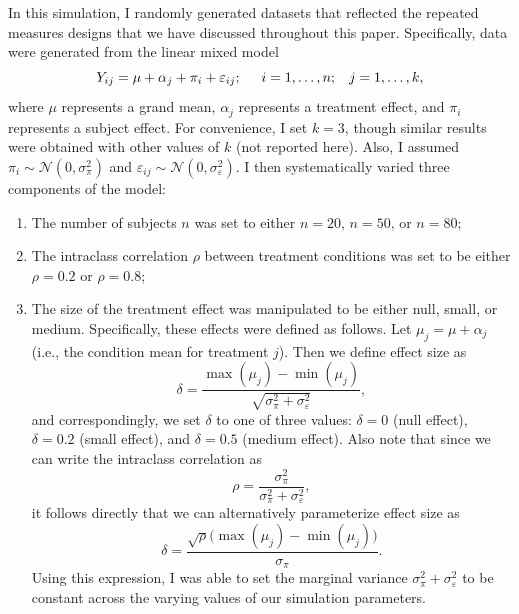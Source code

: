 \documentclass[12pt,twoside,a4paper]{article}
\begin{document}
In this simulation, I randomly generated datasets that reflected the repeated measures designs that we have discussed throughout this paper. Specifically, data were generated from the linear mixed model%
\[
  Y_{ij} = \mu + \alpha_j + \pi_i + \varepsilon_{ij};\hspace{5mm}i=1,\dots,n;\hspace{3mm}j=1,\dots,k,
\]%
where $\mu$ represents a grand mean, $\alpha_j$ represents a treatment effect, and $\pi_i$ represents a subject effect. For convenience, I set $k=3$, though similar results were obtained with other values of $k$ (not reported here). Also, I assumed $\pi_i\sim \mathcal{N}(0,\sigma_{\pi}^2)$ and $\varepsilon_{ij}\sim \mathcal{N}(0,\sigma_{\varepsilon}^2)$. I then systematically varied three components of the model:

\begin{enumerate}
\item The number of subjects $n$ was set to either $n=20$, $n=50$, or $n=80$;
\item The intraclass correlation $\rho$ between treatment conditions was set to be either $\rho=0.2$ or $\rho=0.8$; 
\item The size of the treatment effect was manipulated to be either null, small, or medium. Specifically, these effects were defined as follows. Let $\mu_j = \mu+\alpha_j$ (i.e., the condition mean for treatment $j$). Then we define effect size as%
\[
  \delta = \frac{\max(\mu_j)-\min(\mu_j)}{\sqrt{\sigma_{\pi}^2 + \sigma_{\varepsilon}^2}},
\]%
and correspondingly, we set $\delta$ to one of three values: $\delta=0$ (null effect), $\delta=0.2$ (small effect), and $\delta=0.5$ (medium effect). Also note that since we can write the intraclass correlation as%
\[
  \rho=\frac{\sigma_{\pi}^2}{\sigma_{\pi}^2+\sigma_{\varepsilon}^2},
\]%
it follows directly that we can alternatively parameterize effect size as%
\[
  \delta = \frac{\sqrt{\rho}\bigl(\max(\mu_j)-\min(\mu_j)\bigr)}{\sigma_{\pi}}.
\]%
Using this expression, I was able to set the marginal variance $\sigma^2_{\pi}+\sigma^2_{\varepsilon}$ to be constant across the varying values of our simulation parameters.  
    
\end{enumerate}
\end{document}
